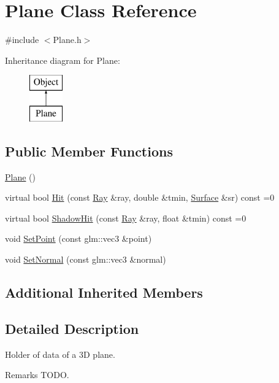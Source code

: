 \hypertarget{class_plane}{}\section{Plane Class Reference}
\label{class_plane}


{\ttfamily \#include $<$Plane.\+h$>$}

Inheritance diagram for Plane\+:\begin{figure}[H]
\begin{center}
\leavevmode
\includegraphics[height=2.000000cm]{class_plane}
\end{center}
\end{figure}
\subsection*{Public Member Functions}
\begin{DoxyCompactItemize}
\item 
\hyperlink{class_plane_acac0d9c003e0ab10d07b146c3566a0c7}{Plane} ()
\item 
virtual bool \hyperlink{class_plane_a71712655452a8ecbfe5907197e980c1e}{Hit} (const \hyperlink{class_ray}{Ray} \&ray, double \&tmin, \hyperlink{class_surface}{Surface} \&sr) const =0
\item 
virtual bool \hyperlink{class_plane_a21f6adf1c2be7853a61e1f8d811b76eb}{Shadow\+Hit} (const \hyperlink{class_ray}{Ray} \&ray, float \&tmin) const =0
\item 
void \hyperlink{group___geometric_objects_ga8fdaa0574a2046f2e280e6c926f7947d}{Set\+Point} (const glm\+::vec3 \&point)
\item 
void \hyperlink{group___geometric_objects_ga50e8800fa3595a6b6fafcda17a77388c}{Set\+Normal} (const glm\+::vec3 \&normal)
\end{DoxyCompactItemize}
\subsection*{Additional Inherited Members}


\subsection{Detailed Description}
Holder of data of a 3D plane. \begin{DoxyRemark}{Remarks}
T\+O\+DO. 
\end{DoxyRemark}


